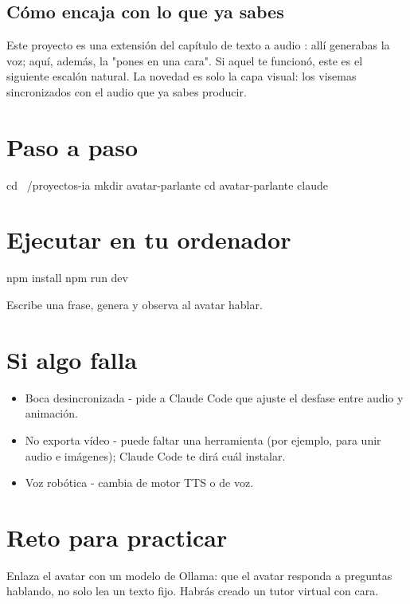 \documentclass[11pt,a4paper]{book}
\begin{document}
\subsection{Cómo encaja con lo que ya sabes}
Este proyecto es una extensión del capítulo de texto a audio : allí generabas la voz; aquí, además, la "pones en una cara". Si aquel te funcionó, este es el siguiente escalón natural. La novedad es solo la capa visual: los visemas sincronizados con el audio que ya sabes producir.

\section{Paso a paso}
\begin{codebox}
cd ~/proyectos-ia
mkdir avatar-parlante
cd avatar-parlante
claude
\end{codebox}
\section{Ejecutar en tu ordenador}
\begin{codebox}
npm install
npm run dev
\end{codebox}
Escribe una frase, genera y observa al avatar hablar.

\section{Si algo falla}
\begin{itemize}\item Boca desincronizada - pide a Claude Code que ajuste el desfase entre audio y animación.\end{itemize}
\begin{itemize}\item No exporta vídeo - puede faltar una herramienta (por ejemplo, para unir audio e imágenes); Claude Code te dirá cuál instalar.\end{itemize}
\begin{itemize}\item Voz robótica - cambia de motor TTS o de voz.\end{itemize}
\section{Reto para practicar}
Enlaza el avatar con un modelo de Ollama: que el avatar responda a preguntas hablando, no solo lea un texto fijo. Habrás creado un tutor virtual con cara.
\end{document}
